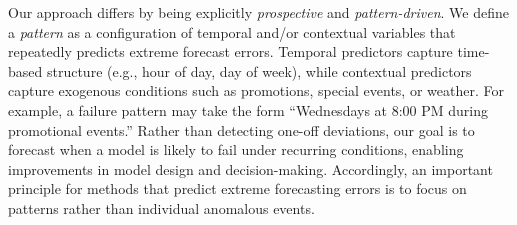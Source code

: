 \documentclass[12pt]{article}
\begin{document}
Our approach differs by being explicitly \emph{prospective} and \emph{pattern-driven}. We define a \emph{pattern} as a configuration of temporal and/or contextual variables that repeatedly predicts extreme forecast errors. Temporal predictors capture time-based structure (e.g., hour of day, day of week), while contextual predictors capture exogenous conditions such as promotions, special events, or weather. For example, a failure pattern may take the form “Wednesdays at 8:00 PM during promotional events.” Rather than detecting one-off deviations, our goal is to forecast when a model is likely to fail under recurring conditions, enabling improvements in model design and decision-making. Accordingly, an important principle for methods that predict extreme forecasting errors is to focus on patterns rather than individual anomalous events.
\end{document}
